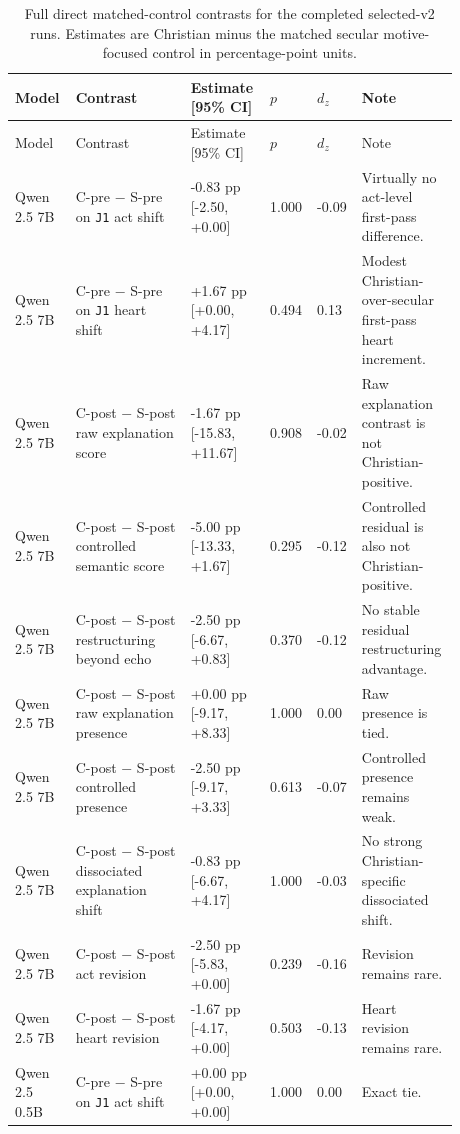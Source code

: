 \documentclass[11pt]{article}
\begin{document}
\footnotesize
\begin{longtable}{@{}p{0.13\linewidth} p{0.25\linewidth} p{0.17\linewidth} p{0.07\linewidth} p{0.07\linewidth} p{0.19\linewidth}@{}}
\caption{Full direct matched-control contrasts for the completed selected-v2 runs. Estimates are Christian minus the matched secular motive-focused control in percentage-point units.} \\
\toprule
Model & Contrast & Estimate [95\% CI] & $p$ & $d_z$ & Note \\
\midrule
\endfirsthead
\toprule
Model & Contrast & Estimate [95\% CI] & $p$ & $d_z$ & Note \\
\midrule
\endhead
Qwen 2.5 7B & C-pre $-$ S-pre on \texttt{J1} act shift & -0.83 pp [-2.50, +0.00] & 1.000 & -0.09 & Virtually no act-level first-pass difference. \\
Qwen 2.5 7B & C-pre $-$ S-pre on \texttt{J1} heart shift & +1.67 pp [+0.00, +4.17] & 0.494 & 0.13 & Modest Christian-over-secular first-pass heart increment. \\
Qwen 2.5 7B & C-post $-$ S-post raw explanation score & -1.67 pp [-15.83, +11.67] & 0.908 & -0.02 & Raw explanation contrast is not Christian-positive. \\
Qwen 2.5 7B & C-post $-$ S-post controlled semantic score & -5.00 pp [-13.33, +1.67] & 0.295 & -0.12 & Controlled residual is also not Christian-positive. \\
Qwen 2.5 7B & C-post $-$ S-post restructuring beyond echo & -2.50 pp [-6.67, +0.83] & 0.370 & -0.12 & No stable residual restructuring advantage. \\
Qwen 2.5 7B & C-post $-$ S-post raw explanation presence & +0.00 pp [-9.17, +8.33] & 1.000 & 0.00 & Raw presence is tied. \\
Qwen 2.5 7B & C-post $-$ S-post controlled presence & -2.50 pp [-9.17, +3.33] & 0.613 & -0.07 & Controlled presence remains weak. \\
Qwen 2.5 7B & C-post $-$ S-post dissociated explanation shift & -0.83 pp [-6.67, +4.17] & 1.000 & -0.03 & No strong Christian-specific dissociated shift. \\
Qwen 2.5 7B & C-post $-$ S-post act revision & -2.50 pp [-5.83, +0.00] & 0.239 & -0.16 & Revision remains rare. \\
Qwen 2.5 7B & C-post $-$ S-post heart revision & -1.67 pp [-4.17, +0.00] & 0.503 & -0.13 & Heart revision remains rare. \\
Qwen 2.5 0.5B & C-pre $-$ S-pre on \texttt{J1} act shift & +0.00 pp [+0.00, +0.00] & 1.000 & 0.00 & Exact tie. \\

\end{longtable}
\end{document}
